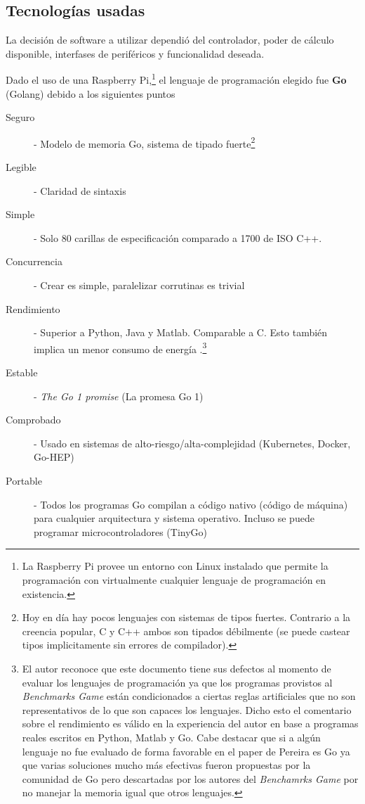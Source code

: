 \subsection{Tecnologías usadas}

La decisión de software a utilizar dependió del controlador, poder de cálculo disponible, interfases de periféricos y funcionalidad deseada.

\medskip

Dado el uso de una Raspberry Pi,\footnote{La Raspberry Pi provee un entorno con Linux instalado que permite la programación con virtualmente cualquier lenguaje de programación en existencia.} el lenguaje de programación elegido fue \textbf{Go} (Golang) debido a los siguientes puntos

\begin{description}
    \item[Seguro] - Modelo de memoria Go, sistema de tipado fuerte\footnote{Hoy en día hay pocos lenguajes con sistemas de tipos fuertes. Contrario a la creencia popular, C y C++ ambos son tipados débilmente (se puede castear tipos implicitamente sin errores de compilador).}
    \item[Legible] - Claridad de sintaxis 
    \item[Simple] - Solo 80 carillas de especificación comparado a 1700 de ISO C++.
    \item[Concurrencia] - Crear  es simple, paralelizar corrutinas es trivial
    \item[Rendimiento] - Superior a Python, Java y Matlab. Comparable a C. Esto también implica un menor consumo de energía \citep{pythonIsSlow}.\footnote{El autor reconoce que este documento tiene sus defectos al momento de evaluar los lenguajes de programación ya que los programas provistos al \textit{Benchmarks Game} están condicionados a ciertas reglas artificiales que no son representativos de lo que son capaces los lenguajes. Dicho esto el comentario sobre el rendimiento es válido en la experiencia del autor en base a programas reales escritos en Python, Matlab y Go. Cabe destacar que si a algún lenguaje no fue evaluado de forma favorable en el paper de Pereira es Go ya que varias soluciones mucho más efectivas fueron propuestas por la comunidad de Go pero descartadas por los autores del \textit{Benchamrks Game} por no manejar la memoria igual que otros lenguajes.}
    \item[Estable] - \textit{The Go 1 promise} (La promesa Go 1)
    \item[Comprobado] -  Usado en sistemas de alto-riesgo/alta-complejidad (Kubernetes, Docker, Go-HEP)
    \item[Portable] - Todos los programas Go compilan a código nativo (código de máquina) para cualquier arquitectura y sistema operativo. Incluso se puede programar microcontroladores (TinyGo)
\end{description}

